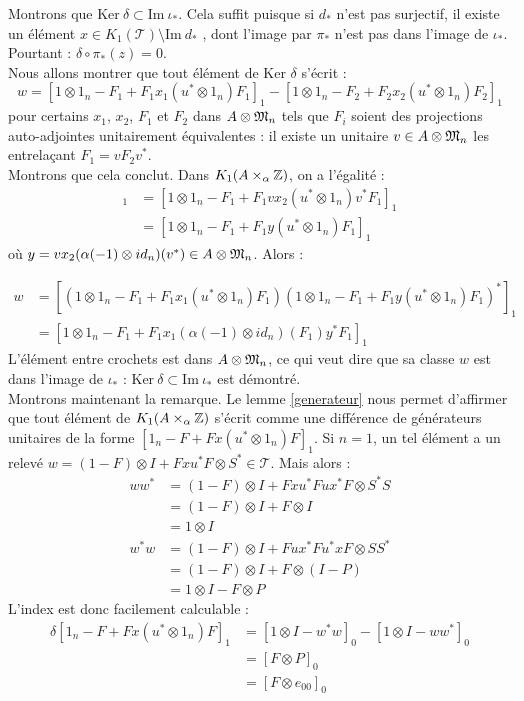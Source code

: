 \begin{dem}
Montrons que $\text{Ker}\ \delta \subset \text{Im}\ \iota_*$. Cela suffit puisque si $d_*$ n'est pas surjectif, il existe un élément $x\in K_1(\mathcal T)\setminus \text{Im}\ d_*$ , dont l'image par $\pi_*$ n'est pas dans l'image de $\iota_*$. Pourtant : $\delta\circ\pi_*( z) =0$.\\

Nous allons montrer que tout élément de $\text{Ker }\delta$ s'écrit :
\[w=[1\otimes 1_n -F_1+F_1x_1(u^*\otimes 1_n)F_1]_1-[1\otimes 1_n -F_2+F_2x_2(u^*\otimes 1_n)F_2]_1\]
pour certains $x_1$, $x_2$, $F_1$ et $F_2$ dans $A\otimes \frak M_n$ tels que $F_i$ soient des projections auto-adjointes unitairement équivalentes : il existe un unitaire $v\in A\otimes \frak M_n$ les entrelaçant $F_1=vF_2v^*$.\\

Montrons que cela conclut. Dans $K_1(A\times_\alpha \mathbb Z)$, on a l'égalité :
\begin{align*}
[1\otimes 1_n -F_2+F_2x_2(u^*\otimes 1_n)F_2]_1 & =[1\otimes 1_n -F_1+F_1 v x_2(u^*\otimes 1_n)v^* F_1]_1 \\
								& = [1\otimes 1_n -F_1+F_1 y (u^*\otimes 1_n)F_1]_1
\end{align*}
où $y=vx_2(\alpha(-1)\otimes id_n)(v^*)\in A\otimes \frak M_n$. Alors :

\begin{align*}
w & =[\left(1\otimes 1_n -F_1+F_1x_1(u^*\otimes 1_n)F_1\right)\left(1\otimes 1_n -F_1+F_1 y (u^*\otimes 1_n)F_1\right)^*]_1 \\
    & = [1\otimes 1_n -F_1+F_1 x_1 (\alpha(-1)\otimes id_n)( F_1) y^* F_1]_1
\end{align*}
L'élément entre crochets est dans $A\otimes \frak M_n$, ce qui veut dire que sa classe $w$ est dans l'image de $\iota_*$ : $\text{Ker}\ \delta \subset \text{Im}\ \iota_*$ est démontré.\\

Montrons maintenant la remarque. Le lemme \ref{generateur} nous permet d'affirmer que tout élément de $K_1(A\times_\alpha \mathbb Z)$ s'écrit comme une différence de générateurs unitaires de la forme $[1_n-F+Fx(u^*\otimes 1_n)F]_1$. Si $n=1$, un tel élément a un relevé $w=(1-F)\otimes I+Fxu^*F\otimes S^*\in\mathcal T$. Mais alors :
\begin{align*}
ww^* &=(1-F)\otimes I + Fxu^*Fux^*F\otimes S^*S \\
	&=(1-F)\otimes I +F\otimes I  \\
            & = 1\otimes I  \\
w^*w &=(1-F)\otimes I + Fux^*Fu^*xF\otimes SS^* \\
	&=(1-F)\otimes I +F\otimes (I-P)\\
           & = 1\otimes I-F\otimes P
\end{align*}
L'index est donc facilement calculable :
\begin{align*}\delta[1_n-F+Fx(u^*\otimes 1_n)F]_1 & =[1\otimes I -w^*w]_0-[1\otimes I -ww^*]_0 \\
&=[F\otimes P]_0\\
&=[F\otimes e_{00}]_0
\end{align*}


\end{dem}
